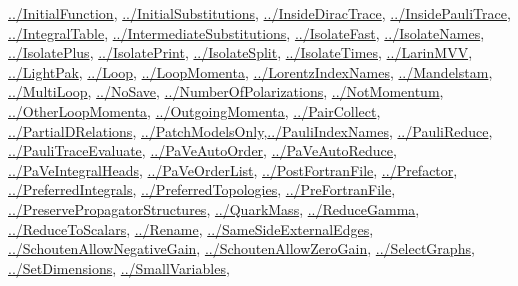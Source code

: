 \documentclass[../FeynCalcManual.tex]{subfiles}
\begin{document}
\begin{itemize}
  \hyperlink{../initialfunction}{../InitialFunction},
  \hyperlink{../initialsubstitutions}{../InitialSubstitutions},
  \hyperlink{../insidediractrace}{../InsideDiracTrace},
  \hyperlink{../insidepaulitrace}{../InsidePauliTrace},
  \hyperlink{../integraltable}{../IntegralTable},
  \hyperlink{../intermediatesubstitutions}{../IntermediateSubstitutions},
  \hyperlink{../isolatefast}{../IsolateFast},
  \hyperlink{../isolatenames}{../IsolateNames},
  \hyperlink{../isolateplus}{../IsolatePlus},
  \hyperlink{../isolateprint}{../IsolatePrint},
  \hyperlink{../isolatesplit}{../IsolateSplit},
  \hyperlink{../isolatetimes}{../IsolateTimes},
  \hyperlink{../larinmvv}{../LarinMVV},
  \hyperlink{../lightpak}{../LightPak}, \hyperlink{../loop}{../Loop},
  \hyperlink{../loopmomenta}{../LoopMomenta},
  \hyperlink{../lorentzindexnames}{../LorentzIndexNames},
  \hyperlink{../mandelstam}{../Mandelstam},
  \hyperlink{../multiloop}{../MultiLoop},
  \hyperlink{../nosave}{../NoSave},
  \hyperlink{../numberofpolarizations}{../NumberOfPolarizations},
  \hyperlink{../notmomentum}{../NotMomentum},
  \hyperlink{../otherloopmomenta}{../OtherLoopMomenta},
  \hyperlink{../outgoingmomenta}{../OutgoingMomenta},
  \hyperlink{../paircollect}{../PairCollect},
  \hyperlink{../partialdrelations}{../PartialDRelations},
  \hyperlink{../patchmodelsonly}{../PatchModelsOnly},\hyperlink{../pauliindexnames}{../PauliIndexNames},
  \hyperlink{../paulireduce}{../PauliReduce},
  \hyperlink{../paulitraceevaluate}{../PauliTraceEvaluate},
  \hyperlink{../paveautoorder}{../PaVeAutoOrder},
  \hyperlink{../paveautoreduce}{../PaVeAutoReduce},
  \hyperlink{../paveintegralheads}{../PaVeIntegralHeads},
  \hyperlink{../paveorderlist}{../PaVeOrderList},
  \hyperlink{../postfortranfile}{../PostFortranFile},
  \hyperlink{../prefactor}{../Prefactor},
  \hyperlink{../preferredintegrals}{../PreferredIntegrals},
  \hyperlink{../preferredtopologies}{../PreferredTopologies},
  \hyperlink{../prefortranfile}{../PreFortranFile},
  \hyperlink{../preservepropagatorstructures}{../PreservePropagatorStructures},
  \hyperlink{../quarkmass}{../QuarkMass},
  \hyperlink{../reducegamma}{../ReduceGamma},
  \hyperlink{../reducetoscalars}{../ReduceToScalars},
  \hyperlink{../rename}{../Rename},
  \hyperlink{../samesideexternaledges}{../SameSideExternalEdges},
  \hyperlink{../schoutenallownegativegain}{../SchoutenAllowNegativeGain},
  \hyperlink{../schoutenallowzerogain}{../SchoutenAllowZeroGain},
  \hyperlink{../selectgraphs}{../SelectGraphs},
  \hyperlink{../setdimensions}{../SetDimensions},
  \hyperlink{../smallvariables}{../SmallVariables},

\end{itemize}
\end{document}
